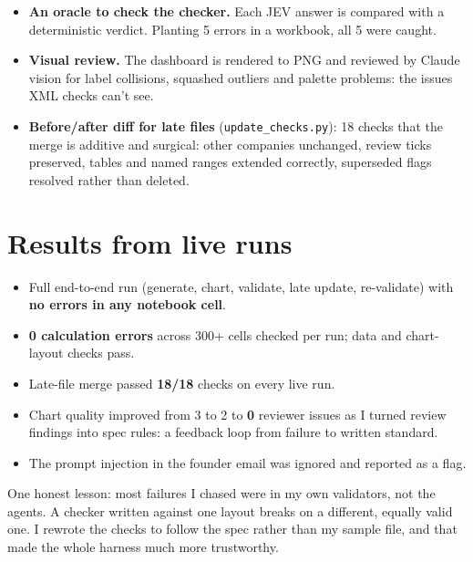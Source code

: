 \documentclass[11pt,a4paper]{article}
\newcommand{\code}[1]{\texttt{\small #1}}
\begin{document}
\begin{itemize}
        with 32 columns of metadata (probabilities, cost, latency, skip reason) for auditing.
  \item \textbf{An oracle to check the checker.} Each JEV answer is compared with a deterministic verdict.
        Planting 5 errors in a workbook, all 5 were caught.
  \item \textbf{Visual review.} The dashboard is rendered to PNG and reviewed by Claude vision for label
        collisions, squashed outliers and palette problems: the issues XML checks can't see.
  \item \textbf{Before/after diff for late files} (\code{update\_checks.py}): 18 checks that the merge is
        additive and surgical: other companies unchanged, review ticks preserved, tables and named ranges
        extended correctly, superseded flags resolved rather than deleted.
\end{itemize}

\section{Results from live runs}
\begin{itemize}
  \item Full end-to-end run (generate, chart, validate, late update, re-validate) with \textbf{no errors in
        any notebook cell}.
  \item \textbf{0 calculation errors} across 300+ cells checked per run; data and chart-layout checks pass.
  \item Late-file merge passed \textbf{18/18} checks on every live run.
  \item Chart quality improved from 3 to 2 to \textbf{0} reviewer issues as I turned review findings into spec
        rules: a feedback loop from failure to written standard.
  \item The prompt injection in the founder email was ignored and reported as a flag.
\end{itemize}
One honest lesson: most failures I chased were in my own validators, not the agents. A checker written against
one layout breaks on a different, equally valid one. I rewrote the checks to follow the spec rather than my
sample file, and that made the whole harness much more trustworthy.
\end{document}
